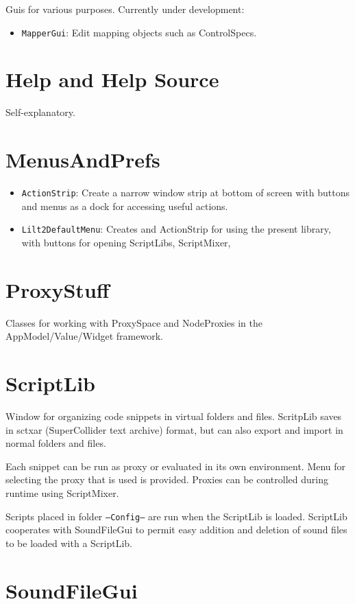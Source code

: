 \documentclass[11pt, a4paper]{scrartcl}
\begin{document}
Guis for various purposes. Currently under development: 

\begin{itemize}
\item \texttt{MapperGui}: Edit mapping objects such as ControlSpecs.
\end{itemize}
\section{Help and Help Source}
\label{sec-4}


Self-explanatory. 
\section{MenusAndPrefs}
\label{sec-5}


\begin{itemize}
\item \texttt{ActionStrip}: Create a narrow window strip at bottom of screen with buttons and menus as a dock for accessing useful actions.
\item \texttt{Lilt2DefaultMenu}: Creates and ActionStrip for using the present library, with buttons for opening ScriptLibs, ScriptMixer,
\end{itemize}
\section{ProxyStuff}
\label{sec-6}


Classes for working with ProxySpace and NodeProxies in the AppModel/Value/Widget framework.
\section{ScriptLib}
\label{sec-7}


Window for organizing code snippets in virtual folders and files. ScritpLib saves in sctxar (SuperCollider text archive) format, but can also export and import in normal folders and files. 

Each snippet can be run as proxy or evaluated in its own environment. Menu for selecting the proxy that is used is provided. Proxies can be controlled during runtime using ScriptMixer. 

Scripts placed in folder \texttt{---Config---} are run when the ScriptLib is loaded.  ScriptLib cooperates with SoundFileGui to permit easy addition and deletion of sound files to be loaded with a ScriptLib. 
\section{SoundFileGui}
\label{sec-8}
\end{document}

